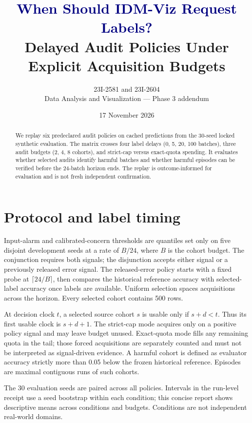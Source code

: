 \documentclass[10pt]{article}
\title{\textcolor{navy}{When Should IDM-Viz Request Labels?}\\[3pt]
\large Delayed Audit Policies Under Explicit Acquisition Budgets}
\author{23I-2581 and 23I-2604\\Data Analysis and Visualization --- Phase 3 addendum}
\date{17 November 2026}
\begin{document}
\maketitle
\begin{abstract}
We replay six predeclared audit policies on cached predictions from the 30-seed locked synthetic evaluation. The matrix crosses four label delays (0, 5, 20, 100 batches), three audit budgets (2, 4, 8 cohorts), and strict-cap versus exact-quota spending. It evaluates whether selected audits identify harmful batches and whether harmful episodes can be verified before the 24-batch horizon ends. The replay is outcome-informed for evaluation and is not fresh independent confirmation.
\end{abstract}
\section{Protocol and label timing}
Input-alarm and calibrated-concern thresholds are quantiles set only on five disjoint development seeds at a rate of $B/24$, where $B$ is the cohort budget. The conjunction requires both signals; the disjunction accepts either signal or a previously released error signal. The released-error policy starts with a fixed probe at $\lceil24/B\rceil$, then compares the historical reference accuracy with selected-label accuracy once labels are available. Uniform selection spaces acquisitions across the horizon. Every selected cohort contains 500 rows.

At decision clock $t$, a selected source cohort $s$ is usable only if $s+d<t$. Thus its first usable clock is $s+d+1$. The strict-cap mode acquires only on a positive policy signal and may leave budget unused. Exact-quota mode fills any remaining quota in the tail; those forced acquisitions are separately counted and must not be interpreted as signal-driven evidence. A harmful cohort is defined as evaluator accuracy strictly more than 0.05 below the frozen historical reference. Episodes are maximal contiguous runs of such cohorts.

The 30 evaluation seeds are paired across all policies. Intervals in the run-level receipt use a seed bootstrap within each condition; this concise report shows descriptive means across conditions and budgets. Conditions are not independent real-world domains.
\end{document}
